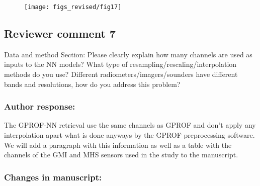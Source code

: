 \begin{itemize}
  \begin{figure}
    \centering
    \texttt{[image: figs\_revised/fig17]}
    \caption{
      }
    \label{fig:data_flow_application}
  \end{figure}

\end{itemize}

\subsection*{Reviewer comment 7}

Data and method Section: Please clearly explain how many channels are used as
inputs to the NN models? What type of resampling/rescaling/interpolation methods
do you use? Different radiometers/imagers/sounders have different bands and
resolutions, how do you address this problem?

\subsubsection*{Author response:}

The GPROF-NN retrieval use the same channels as GPROF and don't apply any
interpolation apart what is done anyways by the GPROF preprocessing
software. We will add a paragraph with this information as well as a table with
the channels of the GMI and MHS sensors used in the study to the manuscript.

\subsubsection*{Changes in manuscript:}

